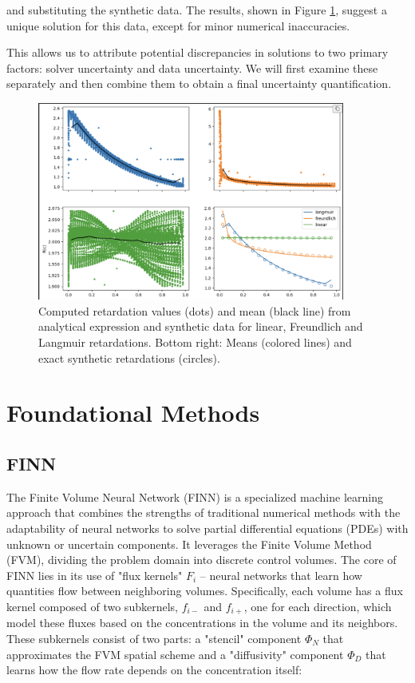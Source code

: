 \documentclass{article}
\begin{document}
and substituting the synthetic data. The results, shown in Figure \ref{fig:ret_uniqueness}, suggest a unique solution for this data, except for minor numerical inaccuracies.

This allows us to attribute potential discrepancies in solutions to two primary factors: solver uncertainty and data uncertainty. We will first examine these separately and then combine them to obtain a final uncertainty quantification.


\begin{figure}
    \centering
    \includegraphics[width=0.9\textwidth]{figs/ret_uniqueness.png}
    \caption{Computed retardation values (dots) and mean (black line) from analytical expression and synthetic data for linear, Freundlich and Langmuir retardations. Bottom right: Means (colored lines) and exact synthetic retardations (circles).}
    \label{fig:ret_uniqueness}
\end{figure}



\section{Foundational Methods}
\subsection{FINN}

The Finite Volume Neural Network (FINN) is a specialized machine learning approach that combines the strengths of traditional numerical methods with the adaptability of neural networks to solve partial differential equations (PDEs) with unknown or uncertain components. It leverages the Finite Volume Method (FVM), dividing the problem domain into discrete control volumes. The core of FINN lies in its use of "flux kernels" $F_i$ – neural networks that learn how quantities flow between neighboring volumes. Specifically, each volume has a flux kernel composed of two subkernels, $f_{i-}$ and $f_{i+}$, one for each direction, which model these fluxes based on the concentrations in the volume and its neighbors. These subkernels consist of two parts: a "stencil" component $\Phi_N$ that approximates the FVM spatial scheme and a "diffusivity" component $\Phi_D$ that learns how the flow rate depends on the concentration itself:
\end{document}
